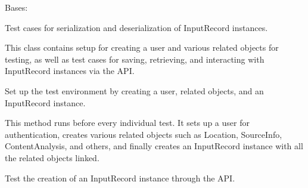\documentclass[letterpaper,10pt,english]{sphinxmanual}
\begin{document}
\begin{fulllineitems}
\label{\detokenize{source/meta_models_management:meta_models_management.tests.InputRecordSerializerTestCase}}
\pysigstartsignatures
{}
\pysigstopsignatures
\sphinxAtStartPar
Bases: 

\sphinxAtStartPar
Test cases for serialization and deserialization of InputRecord instances.

\sphinxAtStartPar
This class contains setup for creating a user and various related objects for testing,
as well as test cases for saving, retrieving, and interacting with InputRecord instances via the API.

\begin{fulllineitems}
\label{\detokenize{source/meta_models_management:meta_models_management.tests.InputRecordSerializerTestCase.setUp}}
\pysigstartsignatures
{}
\pysigstopsignatures
\sphinxAtStartPar
Set up the test environment by creating a user, related objects, and an InputRecord instance.

\sphinxAtStartPar
This method runs before every individual test. It sets up a user for authentication,
creates various related objects such as Location, SourceInfo, ContentAnalysis, and others,
and finally creates an InputRecord instance with all the related objects linked.

\end{fulllineitems}


\begin{fulllineitems}
\label{\detokenize{source/meta_models_management:meta_models_management.tests.InputRecordSerializerTestCase.test_api_create_input_record}}
\pysigstartsignatures
{}
\pysigstopsignatures
\sphinxAtStartPar
Test the creation of an InputRecord instance through the API.


\end{fulllineitems}
\end{fulllineitems}
\end{document}
